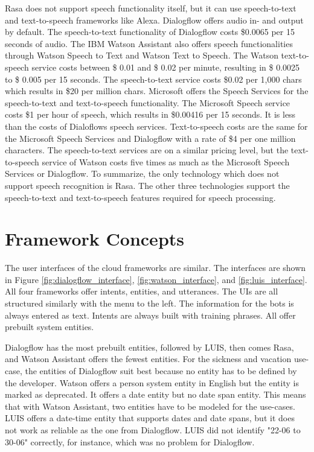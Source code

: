 Rasa does not support speech functionality itself, but it can use speech-to-text and text-to-speech frameworks like Alexa.
Dialogflow offers audio in- and output by default.
The speech-to-text functionality of Dialogflow costs \$0.0065 per 15 seconds of audio.
The IBM Watson Assistant also offers speech functionalities through Watson Speech to Text and Watson Text to Speech.
The Watson text-to-speech service costs between \$ 0.01 and \$ 0.02 per minute, resulting in \$ 0.0025 to \$ 0.005 per 15 seconds.
The speech-to-text service costs \$0.02 per 1,000 chars which results in 
\$20 per million chars.
Microsoft offers the Speech Services for the speech-to-text and text-to-speech functionality.
The Microsoft Speech service costs \$1 per hour of speech, which results in \$0.00416 per 15 seconds.
It is less than the costs of Dialoflows speech services.
Text-to-speech costs are the same for the Microsoft Speech Services and Dialogflow with a rate of \$4 per one million characters.
The speech-to-text services are on a similar pricing level, but the text-to-speech service of Watson costs five times as much as the Microsoft Speech Services or Dialogflow.
To summarize, the only technology which does not support speech recognition is Rasa.
The other three technologies support the speech-to-text and text-to-speech features required for speech processing.   


\section*{Framework Concepts}
The user interfaces of the cloud frameworks are similar.
The interfaces are shown in Figure \ref{fig:dialogflow_interface},
\ref{fig:watson_interface}, and \ref{fig:luis_interface}.
All four frameworks offer intents, entities, and utterances.
The UIs are all structured similarly with the menu to the left.
The information for the bots is always entered as text.
Intents are always built with training phrases.
All offer prebuilt system entities.

Dialogflow has the most prebuilt entities, followed by LUIS,
then comes Rasa, and Watson Assistant offers the fewest entities.
For the sickness and vacation use-case, the entities of Dialogflow suit best because no entity has to be defined by the developer. 
Watson offers a person system entity in English but the entity
is marked as deprecated.
It offers a date entity but no date span entity.
This means that with Watson Assistant, two entities have to be modeled for the use-cases.
LUIS offers a date-time entity that supports dates and date spans, but it does not work as reliable as the one from Dialogflow.
LUIS did not identify "22-06 to 30-06" correctly, for instance, which was no problem for Dialogflow.


